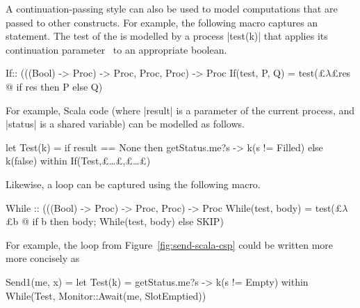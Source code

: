 A continuation-passing style can also be used to model computations that are
passed to other constructs.  For example, the following macro captures an
 statement.  The test of the  is modelled by a process
|test(k)| that applies its continuation parameter~ to
an appropriate boolean.
%
\begin{cspm}
If:: (((Bool) -> Proc) -> Proc, Proc, Proc) -> Proc
If(test, P, Q) = test(£$\lambda$£res @ if res then P else Q)
\end{cspm}
%
For example, Scala code  (where |result| is a parameter of the current process, and
|status| is a shared variable) can be modelled as follows. 
%
\begin{cspm}
let Test(k) = if result == None then getStatus.me?s -> k(s != Filled) else k(false) within If(Test,£\ldots£,£\ldots£)
\end{cspm}
%
Likewise, a  loop can be captured using the following macro.
%
\begin{cspm}
While :: (((Bool) -> Proc) -> Proc, Proc) -> Proc
While(test, body) = test(£$\lambda$£b @ if b then body; While(test, body) else SKIP)
\end{cspm}
For example, the loop  from
Figure~\ref{fig:send-scala-csp} could be written more more concisely as
\begin{cspm}
Send1(me, x) = 
  let Test(k) = getStatus.me?s -> k(s != Empty)
  within While(Test, Monitor::Await(me, SlotEmptied))
\end{cspm}
